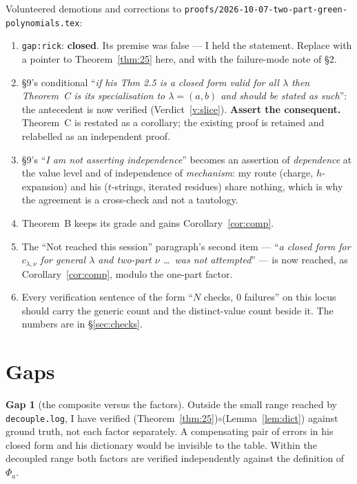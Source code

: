 \documentclass[11pt]{article}
\theoremstyle{definition}
\newtheorem{gap}[theorem]{Gap}
\newcommand{\lam}{\lambda}
\begin{document}
Volunteered demotions and corrections to
\texttt{proofs/2026-10-07-two-part-green-polynomials.tex}:
\begin{enumerate}[label=(\arabic*)]
\item \texttt{gap:rick}: \textbf{closed}. Its premise was false --- I held the statement. Replace
with a pointer to Theorem~\ref{thm:25} here, and with the failure-mode note of \S2.
\item \S9's conditional ``\emph{if his Thm 2.5 is a closed form valid for all $\lam$ then
Theorem~C is its specialisation to $\lam=(a,b)$ and should be stated as such}'': the antecedent is
now verified (Verdict~\ref{v:slice}). \textbf{Assert the consequent.} Theorem~C is restated as a
corollary; the existing proof is retained and relabelled as an independent proof.
\item \S9's ``\emph{I am not asserting independence}'' becomes an assertion of \emph{dependence} at
the value level and of independence of \emph{mechanism}: my route (charge, $h$-expansion) and his
($t$-strings, iterated residues) share nothing, which is why the agreement is a cross-check and
not a tautology.
\item Theorem~B keeps its grade and gains Corollary~\ref{cor:comp}.
\item The ``Not reached this session'' paragraph's second item --- ``\emph{a closed form for
$c_{\lam,\nu}$ for general $\lam$ and two-part $\nu$ \dots\ was not attempted}'' --- is now
reached, as Corollary~\ref{cor:comp}, modulo the one-part factor.
\item Every verification sentence of the form ``$N$ checks, $0$ failures'' on this locus should
carry the generic count and the distinct-value count beside it. The numbers are in
\S\ref{sec:checks}.
\end{enumerate}

\section{Gaps}

\begin{gap}[the composite versus the factors]\label{gap:composite}
Outside the small range reached by \texttt{decouple.log}, I have verified
(Theorem~\ref{thm:25})$\circ$(Lemma~\ref{lem:dict}) against ground truth, not each factor
separately. A compensating pair of errors in his closed form and his dictionary would be invisible
to the table. Within the decoupled range both factors are verified independently against the
definition of $\Phi_a$.
\end{gap}
\end{document}
